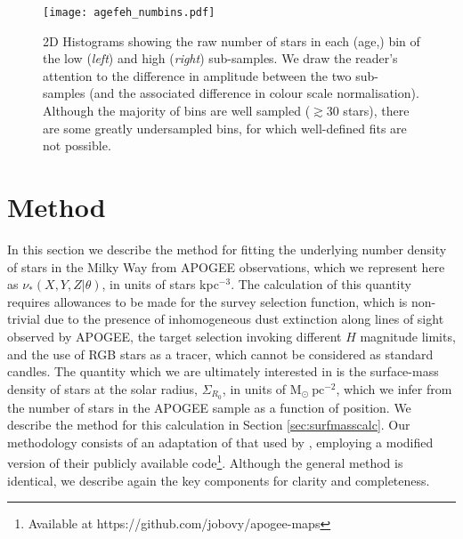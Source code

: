 \begin{figure}
	\texttt{[image: agefeh\_numbins.pdf]}
    \caption{2D Histograms showing the raw number of stars in each (age,\feh{}) bin of the low (\emph{left}) and high (\emph{right}) \afe{} sub-samples. We draw the reader's attention to the difference in amplitude between the two sub-samples (and the associated difference in colour scale normalisation). Although the majority of bins are well sampled ($\gtrsim 30$ stars), there are some greatly undersampled bins, for which well-defined fits are not possible. }
    \label{fig:numbins}
\end{figure}

\section{Method}
\label{sec:methoda}
In this section we describe the method for fitting the underlying number density of stars in the Milky Way from APOGEE observations, which we represent here as $\nu_*(X,Y,Z|\theta)$, in units of stars kpc$^{-3}$. The calculation of this quantity requires allowances to be made for the survey selection function, which is non-trivial due to the presence of inhomogeneous dust extinction along lines of sight observed by APOGEE, the target selection invoking different $H$ magnitude limits, and the use of RGB stars as a tracer, which cannot be considered as standard candles. The quantity which we are ultimately interested in is the surface-mass density of stars at the solar radius, $\Sigma_{R_0}$, in units of $\mathrm{M_{\odot}}\ \mathrm{pc^{-2}}$, which we infer from the number of stars in the APOGEE sample as a function of position. We describe the method for this calculation in Section \ref{sec:surfmasscalc}. Our methodology consists of an adaptation of that used by \citet{2016ApJ...823...30B}, employing a modified version of their publicly available code\footnote{Available at https://github.com/jobovy/apogee-maps}. Although the general method is identical, we describe again the key components for clarity and completeness.

